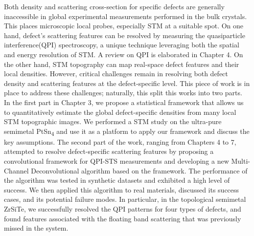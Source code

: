 Both density and scattering cross-section for specific defects are generally inaccessible in global experimental measurements performed in the bulk crystals. This places microscopic local probes, especially \ac{STM} at a suitable spot. On one hand, defect's scattering features can be resolved by measuring the quasiparticle interference(QPI) spectroscopy, a unique technique leveraging both the spatial and energy resolution of \ac{STM}. A review on \ac{QPI} is elaborated in Chapter 4. On the other hand, \ac{STM} topography can map real-space defect features and their local densities. However, critical challenges remain in resolving both defect density and scattering features at the defect-specific level. This piece of work is in place to address these challenges; naturally, this split this works into two parts. In the first part in Chapter 3, we propose a statistical framework that allows us to quantitatively estimate the global defect-specific densities from many local \ac{STM} topographic images. We performed a \ac{STM} study on the ultra-pure semimetal PtSn\textsubscript{4} and use it as a platform to apply our framework and discuss the key assumptions. The second part of the work, ranging from Chapters 4 to 7, attempted to resolve defect-specific scattering features by proposing a convolutional framework for QPI-STS measurements and developing a new Multi-Channel Deconvolutional algorithm based on the framework. The performance of the algorithm was tested in synthetic datasets and exhibited a high level of success. We then applied this algorithm to real materials, discussed its success cases, and its potential failure modes. In particular, in the topological semimetal ZrSiTe, we successfully resolved the \ac{QPI} patterns for four types of defects, and found features associated with the floating band scattering that was previously missed in the system\cite{stuartQuasiparticleInterferenceObservation2022}.  